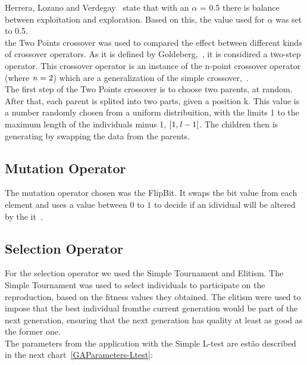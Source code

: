 Herrera, Lozano and Verdegay~\cite{herrera1998tackling} state that with an $\alpha$ = 0.5 there is balance between exploitation and exploration. Based on this, the value used for $\alpha$ was set to 0.5.\\

the Two Points crossover was used to compared the effect between different kinds of crossover operators. As it is defined by Goldeberg,~\cite{Goldberg:1989:GAS:534133}, it is considired a two-step operator. This crossover operator is an instance of the n-point crossover operator (where ${\it n} = 2$) which are a generalization of the simple crossover,~\cite{herrera1998tackling}.\\

The first step of the Two Points crossover is to choose two parents, at random. After that, each parent is splited into two parts, given a position k. This value is a number randomly chosen from a uniform distribuition, with the limits 1 to the maximum length of the individuals minus 1, $[1, {\it l} -1]$. The children then is generating by swapping the data from the parents.\\

\subsection{Mutation Operator}

The mutation operator chosen was the FlipBit. It swaps the bit value from each element and uses a value between $0$ to $1$ to decide if an idividual will be altered by the it~\cite{Goldberg:1989:GASac:534133}.
\subsection{Selection Operator}
For the selection operator we used the Simple Tournament and Elitism. The Simple Tournament was used to select individuals to participate on the reproduction, based on the fitness values they obtained. The elitism were used to impose that the best individual fromthe current generation would be part of the next generation, ensuring that the next generation has quality at least as good as the former one.\\

The parameters from the application with the Simple L-test are estão described in the next chart~\ref{GAParameters-Ltest}:\\

